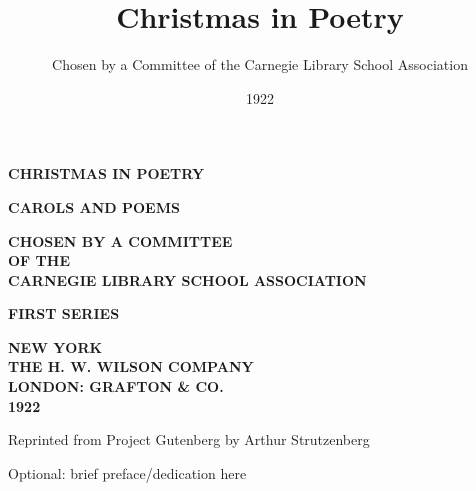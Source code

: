 \documentclass[11pt,oneside]{book}
\title{Christmas in Poetry}
\author{Chosen by a Committee of the Carnegie Library School Association}
\date{1922}
\begin{document}
\begin{titlepage}
\centering
\vspace*{2em}

{\Large\bfseries CHRISTMAS IN POETRY\par}

\vspace{0.8em}
{\large\bfseries CAROLS AND POEMS\par}

\vspace{1.2em}
{\normalsize\bfseries CHOSEN BY A COMMITTEE\\
OF THE\\
CARNEGIE LIBRARY SCHOOL ASSOCIATION\par}

\vspace{1.2em}
{\normalsize\bfseries FIRST SERIES\par}

\vspace{1.8em}
{\normalsize\bfseries NEW YORK\\
THE H. W. WILSON COMPANY\\
LONDON: GRAFTON \& CO.\\
1922\par}

\vfill
{\small Reprinted from Project Gutenberg by Arthur Strutzenberg\par}
\end{titlepage}

\frontmatter
Optional: brief preface/dedication here
 
{\small
  \tableofcontents
}


\mainmatter








































\end{document}
